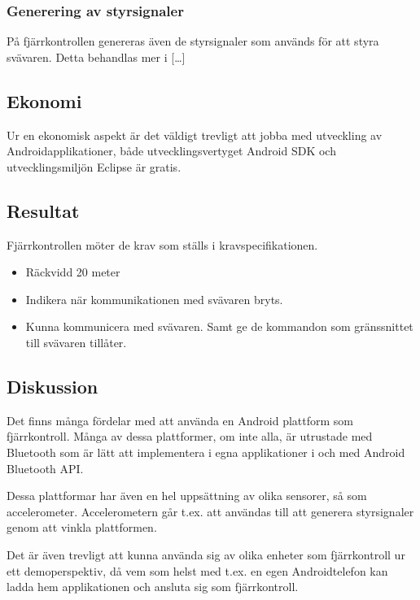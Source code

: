 \subsubsection{Generering av styrsignaler}
På fjärrkontrollen genereras även de styrsignaler som används för att styra svävaren. Detta behandlas mer i […]

\subsection{Ekonomi}
Ur en ekonomisk aspekt är det väldigt trevligt att jobba med utveckling av Androidapplikationer, både utvecklingsvertyget Android SDK och utvecklingsmiljön Eclipse är gratis.

\subsection{Resultat}
Fjärrkontrollen möter de krav som ställs i kravspecifikationen.

\begin {itemize}
\item Räckvidd 20 meter
\item Indikera när kommunikationen med svävaren bryts.
\item Kunna kommunicera med svävaren. Samt ge de kommandon som gränssnittet till svävaren tillåter.
\end {itemize}

\subsection{Diskussion}
Det finns många fördelar med att använda en Android plattform som fjärrkontroll. Många av dessa plattformer, om inte alla, är utrustade med Bluetooth som är lätt att implementera i egna applikationer i och med Android Bluetooth API. 

Dessa plattformar har även en hel uppsättning av olika sensorer, så som accelerometer. Accelerometern går t.ex. att användas till att generera styrsignaler genom att vinkla plattformen.

Det är även trevligt att kunna använda sig av olika enheter som fjärrkontroll ur ett demoperspektiv, då vem som helst med t.ex. en egen Androidtelefon kan ladda hem applikationen och ansluta sig som fjärrkontroll. 






